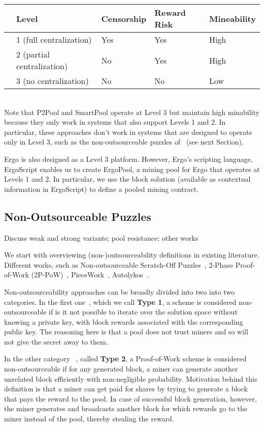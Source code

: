 \documentclass[11pt]{article}
\newcommand{\langname}{ErgoScript\xspace}
\newcommand{\poolname}{ErgoPool\xspace}
\begin{document}
	\begin{tabular}{lllll}
		& Level & Censorship & Reward Risk & Mineability \\\hline
		& 1 (full centralization)    & Yes & Yes & High \\
		& 2 (partial centralization)    & No & Yes & High \\
		& 3 (no centralization)    & No & No & Low
	\end{tabular}

~\\

Note that P2Pool and SmartPool operate at Level 3 but maintain high minability because they only work in systems that also support Levels  1 and 2. In particular, these approaches don't work in systems that are designed to operate only in Level 3, such as the non-outsourceable puzzles of~\cite{} (see next Section). 

Ergo is also designed as a Level 3 platform. However, Ergo's scripting language, \langname enables us to create \poolname, a mining pool for Ergo that operates at Levels 1 and 2. In particular, we use the block solution (available as contextual information in \langname) to define a pooled mining contract.

\subsection{Non-Outsourceable Puzzles}

Discuss weak and strong variants; pool resistance; other works

We start with overviewing (non-)outsourceability definitions in existing literature. Different works, such as
Non-outsourceable Scratch-Off Puzzles~\cite{miller2015nonoutsourceable}, 2-Phase Proof-of-Work (2P-PoW)~\cite{twophase},
PieceWork~\cite{daian2017short}, Autolykos~\cite{autolykos}.


Non-outsourceability approaches can be broadly divided into two into two categories. In the first one~\cite{autolykos, daian2017short, twophase}, which we call \textbf{Type 1}, a scheme is considered
non-outsourceable if is it not possible to iterate over the solution space without knowing a private key, with block rewards associated with the corresponding public key. The reasoning here is that a pool does not trust miners and so will not give the secret away to them.  

In the other category
~\cite{miller2015nonoutsourceable}, called \textbf{Type 2}, a Proof-of-Work scheme is considered non-outsourceable if for any generated block, a miner can generate another unrelated block efficiently with non-negligible probability. Motivation behind this definition is that a miner can get paid for shares
by trying to generate a block that pays the reward to the pool. In case of successful block generation, however, the miner generates and broadcasts another block for which rewards go to the miner instead of the pool, thereby stealing the reward. 
\end{document}

